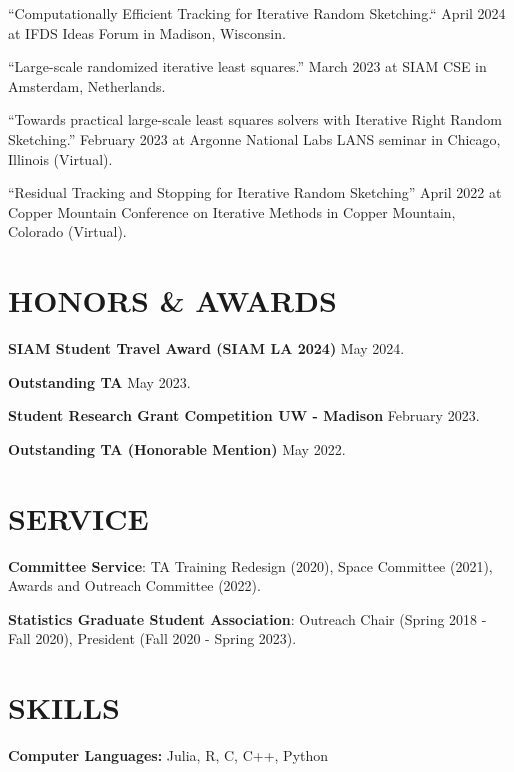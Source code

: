 \documentclass[margin,11pt]{res}
\begin{document}
\begin{resume}
``Computationally Efficient Tracking for Iterative Random Sketching.`` April 2024 at IFDS Ideas Forum in Madison, Wisconsin.

``Large-scale randomized iterative least squares.'' March 2023 at SIAM CSE in Amsterdam, Netherlands.

``Towards practical large-scale least squares solvers with Iterative Right Random Sketching.'' February 2023 at Argonne National Labs LANS seminar in Chicago, Illinois (Virtual).

``Residual Tracking and Stopping for Iterative Random Sketching'' April 2022 at Copper Mountain Conference on Iterative Methods in Copper Mountain, Colorado (Virtual).




\section{HONORS \& AWARDS} 
{\bf SIAM Student Travel Award (SIAM LA 2024)} \hfill May 2024.

{\bf Outstanding TA} \hfill May 2023.

{\bf Student Research Grant Competition UW - Madison} \hfill February 2023.

{\bf Outstanding TA (Honorable Mention)} \hfill May 2022.

\section{SERVICE}

\textbf{Committee Service}: TA Training Redesign (2020), Space Committee (2021), Awards and Outreach Committee (2022).

\textbf{Statistics Graduate Student Association}: Outreach Chair (Spring 2018 - Fall 2020), President (Fall 2020 - Spring 2023). 

\section{SKILLS}
\textbf{Computer Languages:} Julia, R, C, C++, Python


\end{resume}
\end{document}
